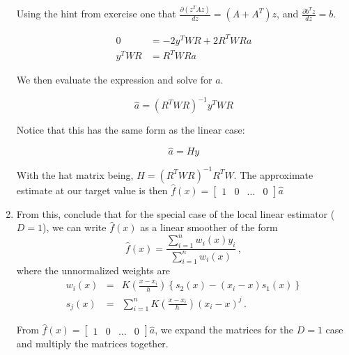 \documentclass[10pt]{article}
\begin{document}
\begin{enumerate}[label=(\Alph*)]
        Using the hint from exercise one that $\frac{\partial (z^T A z)}{dz} = (A + A^T) z$, and $ \frac{\partial b^T z}{dz} = b$.

        \begin{align*}
            0 &= -2y^T W R + 2 R^T W R a \\
            y^T W R&= R^T W R a
        \end{align*}

        We then evaluate the expression and solve for $a$.

        $$\hat{a} = (R^T W R)^{-1} y^T W R$$

        Notice that this has the same form as the linear case:

        $$\hat{a} = H y$$

        With the hat matrix being, $H = (R^T W R)^{-1} R^T W$. The approximate estimate at our target value is then $\hat{f}(x) = \begin{bmatrix}1 & 0 & \dots & 0\end{bmatrix} \hat{a}$


        \item From this, conclude that for the special case of the local linear estimator ($D=1$), we can write $\hat{f}(x)$ as a linear smoother of the form
        $$
        \hat{f}(x) = \frac{\sum_{i=1}^n w_i(x) y_i }{\sum_{i=1}^n w_i(x)} \, ,
        $$
        where the unnormalized weights are
        \begin{eqnarray*}
        w_i(x) &=& K \left( \frac{x-x_i}{h} \right) \left\{  s_2(x) - (x_i-x) s_1(x) \right\}\\
        s_j(x) &=& \sum_{i=1}^n K \left( \frac{x-x_i}{h} \right) (x_i-x)^j \, .
        \end{eqnarray*}

        From $\hat{f}(x) = \begin{bmatrix}1 & 0 & \dots & 0\end{bmatrix} \hat{a}$, we expand the matrices for the $D=1$ case and multiply the matrices together.


\end{enumerate}
\end{document}
